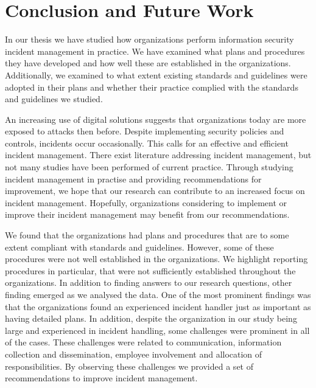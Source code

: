 \chapter{Conclusion and Future Work}

In our thesis we have studied how organizations perform information security incident management in practice. We have examined what plans and procedures they have developed and how well these are established in the organizations. Additionally, we examined to what extent existing standards and guidelines were adopted in their plans and whether their practice complied with the standards and guidelines we studied.

An increasing use of digital solutions suggests that organizations today are more exposed to attacks then before. Despite implementing security policies and controls, incidents occur occasionally. This calls for an effective and efficient incident management. There exist literature addressing incident management, but not many studies have been performed of current practice. Through studying incident management in practise and providing recommendations for improvement, we hope that our research can contribute to an increased focus on incident management. Hopefully, organizations considering to implement or improve their incident management may benefit from our recommendations.

We found that the organizations had plans and procedures that are to some extent compliant with standards and guidelines. However, some of these procedures were not well established in the organizations. We highlight reporting procedures in particular, that were not sufficiently established throughout the organizations. In addition to finding answers to our research questions, other finding emerged as we analysed the data. One of the most prominent findings was that the organizations found an experienced incident handler just as important as having detailed plans. In addition, despite the organization in our study being large and experienced in incident handling, some challenges were prominent in all of the cases. These challenges were related to communication, information collection and dissemination, employee involvement and allocation of responsibilities. By observing these challenges we provided a set of recommendations to improve incident management.

